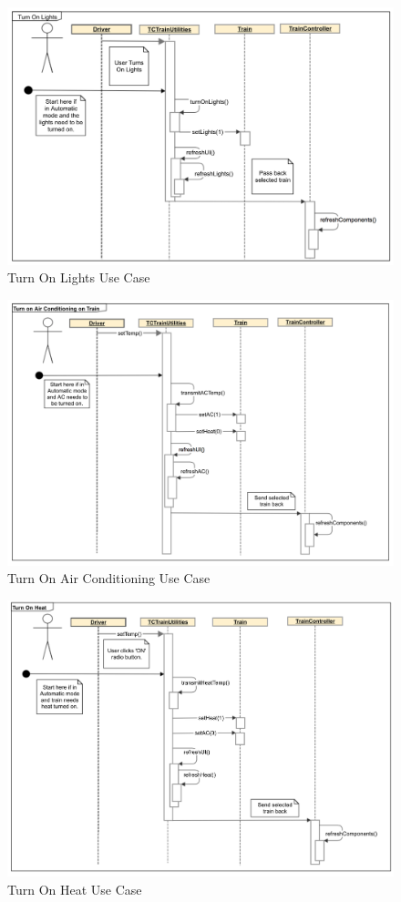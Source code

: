 \documentclass[]{article}
\begin{document}
\begin{figure}[H]
	\centering
	\includegraphics[scale=.5]{tc_turnOnLights_usecase}
	\caption{Turn On Lights Use Case}
\end{figure}

\begin{figure}[H]
	\centering
	\includegraphics[scale=.5]{tc_turnOnAC_usecase}
	\caption{Turn On Air Conditioning Use Case}
\end{figure}

\begin{figure}[H]
	\centering
	\includegraphics[scale=.5]{tc_turnOnHeat_usecase}
	\caption{Turn On Heat Use Case}
\end{figure}
\end{document}
